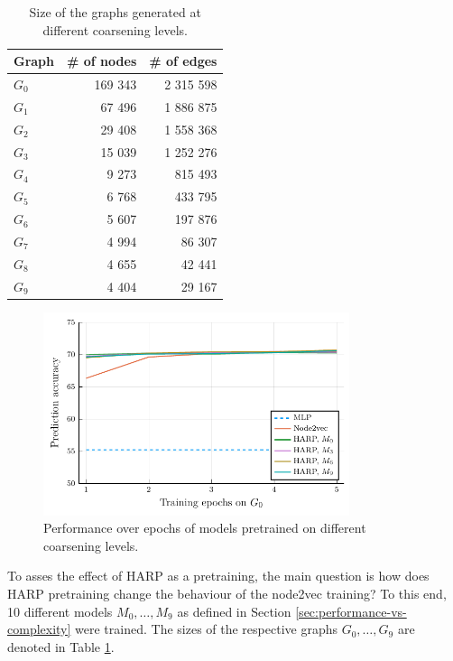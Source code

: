 \begin{table}
  \centering
  \begin{tabular}{lrr}
    \toprule
    Graph     & \# of nodes & \# of edges \\
    \midrule
    \( G_0 \) & 169 343     & 2 315 598   \\
    \( G_1 \) & 67 496      & 1 886 875   \\
    \( G_2 \) & 29 408      & 1 558 368   \\
    \( G_3 \) & 15 039      & 1 252 276   \\
    \( G_4 \) & 9 273       & 815 493     \\
    \( G_5 \) & 6 768       & 433 795     \\
    \( G_6 \) & 5 607       & 197 876     \\
    \( G_7 \) & 4 994       & 86 307      \\
    \( G_8 \) & 4 655       & 42 441      \\
    \( G_9 \) & 4 404       & 29 167      \\
  \end{tabular}
  \caption{Size of the graphs generated at different coarsening levels.}\label{tab:graph-sizes}
\end{table}

\begin{figure}
  \centering
  \includegraphics[width=0.8\textwidth]{images/steps_accur/steps_accur.pdf}
  \caption{Performance over epochs of models pretrained on different coarsening levels.}\label{fig:steps-accuracy}
\end{figure}

To asses the effect of HARP as a pretraining, the main question is how does HARP pretraining change the behaviour of the node2vec training? To this end, 10 different models \( M_0, \dots, M_9 \) as defined in Section \ref{sec:performance-vs-complexity} were trained. The sizes of the respective graphs \( G_0, \dots, G_9 \) are denoted in Table \ref{tab:graph-sizes}.

